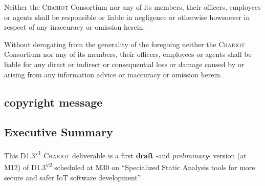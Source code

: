 \documentclass[11pt,a4paper,svgnames]{article}
\begin{document}
\begin{titlepage}
\begin{center}
{{      Neither the \textsc{Chariot}
      Consortium nor any of its members, their officers, employees or
      agents shall be responsible or liable in negligence or otherwise
      howsoever in respect of any inaccuracy or omission herein.
      
      Without derogating from the generality of the foregoing neither
      the \textsc{Chariot} Consortium nor any of its members, their
      officers, employees or agents shall be liable for any direct or
      indirect or consequential loss or damage caused by or arising
      from any information advice or inaccuracy or omission herein.  }
  }
\end{center}

\smallskip



 \subsection*{copyright message}

 \begin{center}
 \end{center}

 \smallskip
 

  \subsection*{Executive Summary}

  This D1.3\textsuperscript{v1} \textsc{Chariot} deliverable is
  {\color{red}{(was)}} a first \textbf{draft} -and \emph{preliminary}-
  version (at M12) of D1.3\textsuperscript{v2} scheduled at M30 on
  ``Specialized Static Analysis tools for more secure and safer IoT
  software development''.


\end{titlepage}
\end{document}
